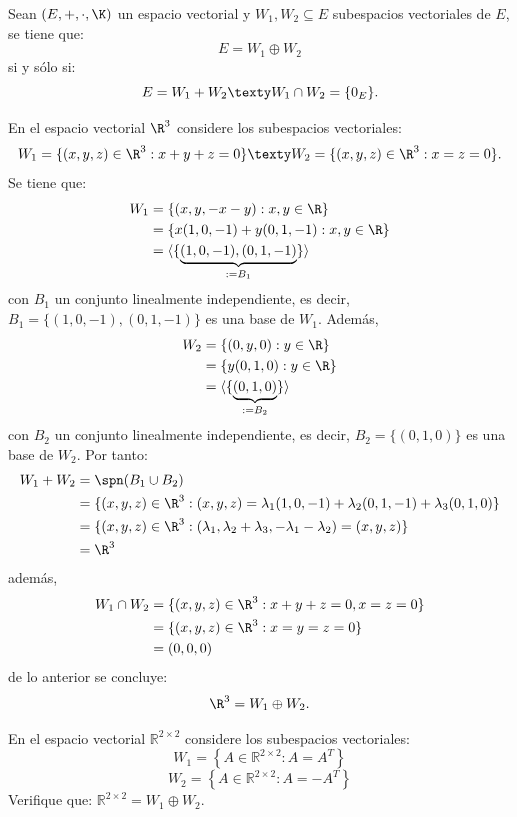 \documentclass[compacto,10pt]{pubciencias-notas}
\begin{document}
\begin{teo}
    Sean $(E,+,\cdot,\K)$ un espacio vectorial y  $W_1,W_2\subseteq E$ subespacios vectoriales de $E$, se tiene que:
    \[
        E = W_1 \oplus W_2
    \]
    si y sólo si:
    \[
        E = W_1 + W_2 \texty
        W_1 \cap W_2 = \{0_{E}\}.
    \]
\end{teo}
\begin{ejem}\hspace{0pt}\label{EjemDirecta1} En el espacio vectorial $\R^{3}$ considere los subespacios vectoriales:
\[
    W_{1} = \{(x,y,z)\in \R^3: x+y+z=0\}
    \texty 
    W_{2} = \{(x,y,z)\in \R^3: x=z=0\}.
\]
Se tiene que:
\begin{align*}
    W_{1} &= \{(x,y,-x-y): x,y\in\R\}\\
    &= \{x(1,0,-1)+y(0,1,-1): x,y\in\R\}\\
    &= \langle \{\underbrace{(1,0,-1), (0,1,-1)}_{:=B_1}\}\rangle
\end{align*}
con $B_1$ un conjunto linealmente independiente, es decir, $B_1=\{(1,0,-1), (0,1,-1)\}$ es una base de $W_1$. Además,
\begin{align*}
    W_{2} &= \{(0,y,0): y\in\R\}\\
    &= \{y(0,1,0): y\in\R\}\\
    &= \langle \{\underbrace{(0,1,0)}_{:=B_2}\}\rangle
\end{align*}
con $B_2$ un conjunto linealmente independiente, es decir, $B_2=\{(0,1,0)\}$ es una base de $W_2$.
Por tanto:
\begin{align*}
    W_1+W_2 &= \spn(B_1\cup B_2)\\
    &= \{(x,y,z)\in\R^3 : (x,y,z)=\lambda_1 (1,0,-1) + \lambda_2 (0,1,-1) + \lambda_3 (0,1,0) \}\\
    &= \{(x,y,z)\in\R^3 : (\lambda_1, \lambda_2+\lambda_3, -\lambda_1-\lambda_2)=(x,y,z)\}\\
    &= \R^{3}
\end{align*}
además,
\begin{align*}
    W_1 \cap W_2 &= \{(x,y,z)\in\R^3 : x+y+z=0, x=z=0\}\\
    &= \{(x,y,z)\in\R^3 : x=y=z=0\}\\
    &= (0,0,0)
\end{align*}
de lo anterior se concluye:
\[
    \R^{3} = W_{1} \oplus W_{2}.
\]
\end{ejem}

\begin{ejer}\hspace{0pt} En el espacio vectorial $\mathbb{R}^{2\times 2}$ considere los subespacios vectoriales:
\[W_1 = \left\{A\in \mathbb{R}^{2\times 2} : A=A^T\right\}\]
\[W_2 = \left\{A\in \mathbb{R}^{2\times 2} : A=-A^T\right\}\]
Verifique que: $\mathbb{R}^{2\times 2} = W_1 \oplus W_2$.
\end{ejer}
\end{document}
